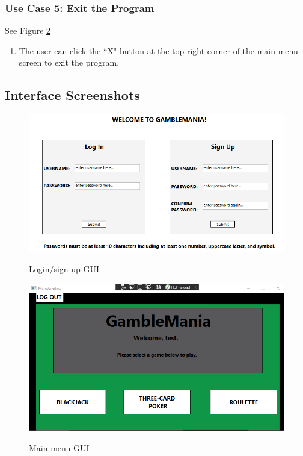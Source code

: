 \documentclass[10pt,conference,onecolumn,compsoc]{IEEEtran}
\begin{document}
\subsubsection{Use Case 5: Exit the Program}
See Figure \ref{fig:main}
\begin{enumerate}
\item The user can click the ``X" button at the top right corner of the main menu screen to exit the program.
\end{enumerate}

\newpage
\subsection{Interface Screenshots}

\begin{figure}[h]
\caption{Login/sign-up GUI}
\includegraphics[scale=0.7]{Sign_Up}
\label{fig:login}
\centering
\end{figure}

\begin{figure}[h]
\caption{Main menu GUI}
\includegraphics[scale=0.7]{Main_Menu}
\label{fig:main}
\centering
\end{figure}
\end{document}
